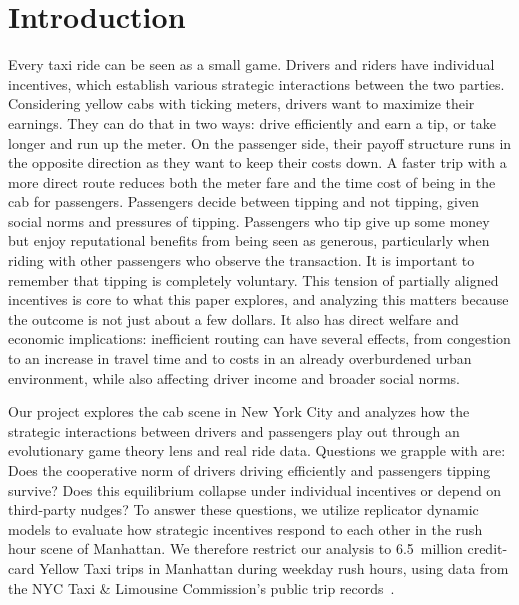\documentclass[pdflatex,sn-mathphys-num]{sn-jnl}%
\theoremstyle{thmstyleone}%
\theoremstyle{thmstyletwo}%
\theoremstyle{thmstylethree}%
\begin{document}
\maketitle

\section{Introduction}\label{sec1}
Every taxi ride can be seen as a small game. Drivers and riders have individual incentives, which establish various strategic interactions between the two parties. Considering yellow cabs with ticking meters, drivers want to maximize their earnings. They can do that in two ways: drive efficiently and earn a tip, or take longer and run up the meter. On the passenger side, their payoff structure runs in the opposite direction as they want to keep their costs down. A faster trip with a more direct route reduces both the meter fare and the time cost of being in the cab for passengers. Passengers decide between tipping and not tipping, given social norms and pressures of tipping. Passengers who tip give up some money but enjoy reputational benefits from being seen as generous, particularly when riding with other passengers who observe the transaction. It is important to remember that tipping is completely voluntary. This tension of partially aligned incentives is core to what this paper explores, and analyzing this matters because the outcome is not just about a few dollars. It also has direct welfare and economic implications: inefficient routing can have several effects, from congestion to an increase in travel time and to costs in an already overburdened urban environment, while also affecting driver income and broader social norms.

Our project explores the cab scene in New York City and analyzes how the strategic interactions between drivers and passengers play out through an evolutionary game theory lens and real ride data. Questions we grapple with are: Does the cooperative norm of drivers driving efficiently and passengers tipping survive? Does this equilibrium collapse under individual incentives or depend on third-party nudges? To answer these questions, we utilize replicator dynamic models to evaluate how strategic incentives respond to each other in the rush hour scene of Manhattan. We therefore restrict our analysis to 6.5~million credit-card Yellow Taxi trips in Manhattan during weekday rush hours, using data from the NYC Taxi \& Limousine Commission's public trip records~\cite{tlc2024}.
\end{document}
